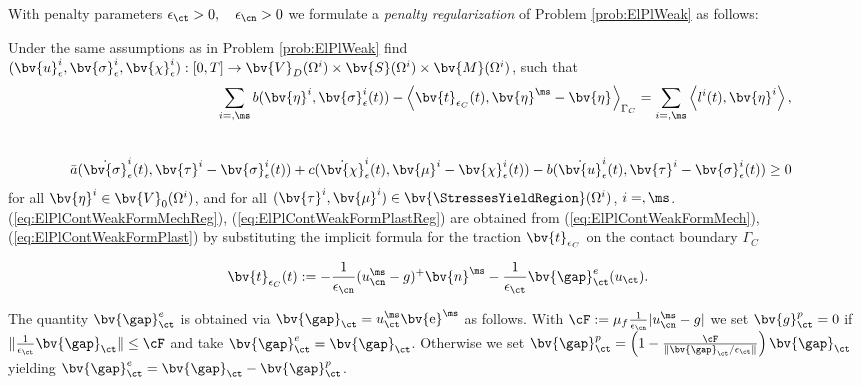  With penalty parameters $\epsilon_{\ct}>0,\quad\epsilon_{\cn}>0$
we formulate a {\it penalty regularization} of Problem \ref{prob:ElPlWeak} as follows:
\begin{problem}\label{prob:ElPlWeakRegularizedContact}
Under the same assumptions as in Problem  \ref{prob:ElPlWeak}
find $(\bv{u}^i_{\epsilon},\bv{\sigma}^{i}_{\epsilon},\bv{\chi}^i_{\epsilon}): [0,T] \rightarrow \bv{V}_D(\Omega^i)\times \bv{S}(\Omega^i)\times \bv{M}(\Omega^i)$, such that
\begin{eqnarray}
\sum \limits_{i=\sl,\ms}  b(\bv{\eta}^i,\bv{\sigma}^i_{\epsilon}(t))- \left\langle \bv{t}_{\epsilon_C}(t), \bv{\eta}^{\ms}-\bv{\eta}^{\sl} \right\rangle_{\Gamma_C}    =\sum \limits_{i=\sl,\ms}\left\langle l^{i}(t),\bv{\eta}^{i}\right\rangle, & &\label{eq:ElPlContWeakFormMechReg}\\[5ex]
 \bar{a}(\dot{\bv{\sigma}}^i_{\epsilon}(t),\bv{\tau}^i-\bv{\sigma}^i_{\epsilon}(t))+c(\dot{\bv{\chi}}^i_{\epsilon}(t),\bv{\mu}^i-\bv{\chi}^i_{\epsilon}(t))-b(\dot{\bv{u}}^i_{\epsilon}(t),\bv{\tau}^i-\bv{\sigma}^i_{\epsilon}(t))\geq 0 &&\label{eq:ElPlContWeakFormPlastReg} 
\end{eqnarray}
for all $\bv{\eta}^i \in \bv{V}_0(\Omega^i) $, and for all $(\bv{\tau}^i,\bv{\mu}^i)\in \bv{\StressesYieldRegion}(\Omega^i)$, $i=\sl,\ms$. (\ref{eq:ElPlContWeakFormMechReg}), (\ref{eq:ElPlContWeakFormPlastReg})  are obtained from (\ref{eq:ElPlContWeakFormMech}), (\ref{eq:ElPlContWeakFormPlast}) by substituting  the implicit formula for the traction $\bv{t}_{\epsilon_C}$ on the contact boundary $\Gamma_C$

\begin{equation}\label{eq:RegularizedContactTraction}
\bv{t}_{\epsilon_C}(t):=-\frac{1}{\epsilon_{\cn}}(u_{\cn}^{\ms\sl}-g)^+\bv{n}^{\ms}-\frac{1}{\epsilon_{\ct}}\bv{\gap}^e_{\ct}(u_{\ct}).
\end{equation}
\end{problem}
The quantity $\bv{\gap}_{\ct}^e$ is obtained via $\bv{\gap}_{\ct}=u^{\sl\ms}_{\ct}\bv{{\mathrm e}}^{\ms}$ as follows. 
With $\cF:=\mu_f\frac{1}{\epsilon_{\cn}}|u^{\sl\ms}_{\cn}-g|$ we set $\bv{g} _{\ct}^p=0$ if
$\|\frac{1}{\epsilon_{\ct}}\bv{\gap} _{\ct}\|\leq \cF$ and take $\bv{\gap} _{\ct}^e=\bv{\gap} _{\ct}$. Otherwise we set
$\bv{\gap} _{\ct}^p=\left(1-\frac{\cF}{\|\bv{\gap}_{\ct}/\epsilon_{\ct}\|}\right)\bv{\gap} _{\ct}$ yielding
$\bv{\gap} _{\ct}^e=\bv{\gap}_{\ct}-\bv{\gap} _{\ct}^p$. 

